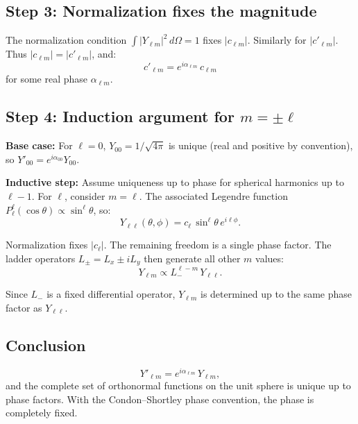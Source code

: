 \documentclass[12pt]{article}
\begin{document}
\subsection*{Step 3: Normalization fixes the magnitude}

The normalization condition $\int |Y_{\ell m}|^2\,d\Omega = 1$ fixes $|c_{\ell m}|$. Similarly for $|c'_{\ell m}|$. Thus $|c_{\ell m}| = |c'_{\ell m}|$, and:
\[
c'_{\ell m} = e^{i\alpha_{\ell m}}\,c_{\ell m}
\]
for some real phase $\alpha_{\ell m}$.

\subsection*{Step 4: Induction argument for $m = \pm\ell$}

\textbf{Base case:} For $\ell = 0$, $Y_{00} = 1/\sqrt{4\pi}$ is unique (real and positive by convention), so $Y'_{00} = e^{i\alpha_{00}}Y_{00}$.

\textbf{Inductive step:} Assume uniqueness up to phase for spherical harmonics up to $\ell - 1$. For $\ell$, consider $m = \ell$. The associated Legendre function $P_\ell^\ell(\cos\theta) \propto \sin^\ell\theta$, so:
\[
Y_{\ell\ell}(\theta,\phi) = c_\ell\,\sin^\ell\theta\,e^{i\ell\phi}.
\]

Normalization fixes $|c_\ell|$. The remaining freedom is a single phase factor. The ladder operators $L_\pm = L_x \pm iL_y$ then generate all other $m$ values:
\[
Y_{\ell m} \propto L_-^{\ell-m}\,Y_{\ell\ell}.
\]

Since $L_-$ is a fixed differential operator, $Y_{\ell m}$ is determined up to the same phase factor as $Y_{\ell\ell}$.

\subsection*{Conclusion}

\[
\boxed{Y'_{\ell m} = e^{i\alpha_{\ell m}}\,Y_{\ell m},}
\]
and the complete set of orthonormal functions on the unit sphere is unique up to phase factors. With the Condon--Shortley phase convention, the phase is completely fixed.
\end{document}
